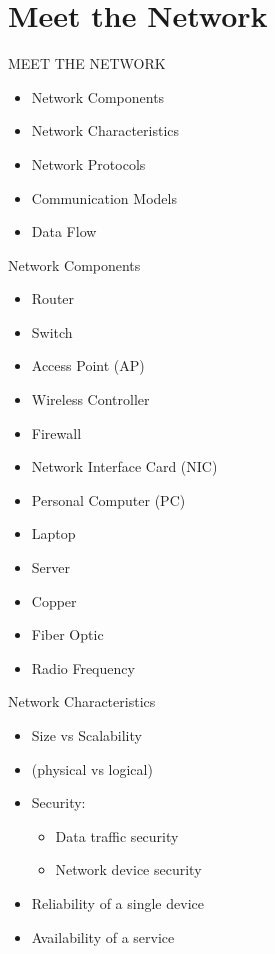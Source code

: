 \section[meet]{Meet the Network}

\begin{frame}{MEET THE NETWORK}
	\begin{itemize}
		\item Network Components
		\item Network Characteristics
		\item Network Protocols
		\item Communication Models
		\item Data Flow
	\end{itemize}
\end{frame}

\begin{frame}{Network Components}
	\begin{itemize}[<2->]
		\item Router
		\item Switch
		\item Access Point (AP)
		\item Wireless Controller
		\item Firewall
		\item Network Interface Card (NIC)
	\end{itemize}
	\begin{itemize}[<3->]
		\item Personal Computer (PC)
		\item Laptop
		\item Server
	\end{itemize}
	\begin{itemize}[<4->]
		\item Copper
		\item Fiber Optic
		\item Radio Frequency
	\end{itemize}
\end{frame}

\begin{frame}{Network Characteristics}
	\begin{itemize}[<+->]
		\item Size vs Scalability
		\item {} (physical vs logical)
		\item Security:
		\begin{itemize}
			\item Data traffic security
			\item Network device security
		\end{itemize}
		\item Reliability of a single device
		\item Availability of a service
	\end{itemize}
\end{frame}

